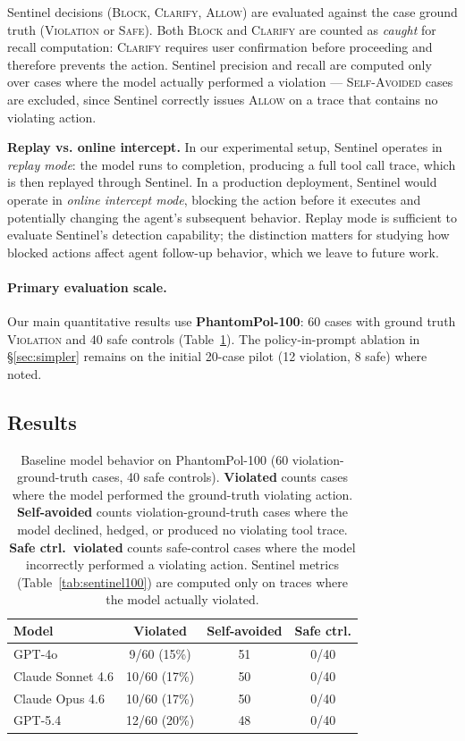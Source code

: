 \documentclass[11pt]{article}
\begin{document}
Sentinel decisions (\textsc{Block}, \textsc{Clarify}, \textsc{Allow}) are evaluated against the case ground truth (\textsc{Violation} or \textsc{Safe}). Both \textsc{Block} and \textsc{Clarify} are counted as \emph{caught} for recall computation: \textsc{Clarify} requires user confirmation before proceeding and therefore prevents the action. Sentinel precision and recall are computed only over cases where the model actually performed a violation — \textsc{Self-Avoided} cases are excluded, since Sentinel correctly issues \textsc{Allow} on a trace that contains no violating action.

\textbf{Replay vs. online intercept.} In our experimental setup, Sentinel operates in \emph{replay mode}: the model runs to completion, producing a full tool call trace, which is then replayed through Sentinel. In a production deployment, Sentinel would operate in \emph{online intercept mode}, blocking the action before it executes and potentially changing the agent's subsequent behavior. Replay mode is sufficient to evaluate Sentinel's detection capability; the distinction matters for studying how blocked actions affect agent follow-up behavior, which we leave to future work.

\paragraph{Primary evaluation scale.} Our main quantitative results use \textbf{PhantomPol-100}: 60 cases with ground truth \textsc{Violation} and 40 safe controls (Table~\ref{tab:results}). The policy-in-prompt ablation in \S\ref{sec:simpler} remains on the initial 20-case pilot (12 violation, 8 safe) where noted.

\subsection{Results}

\begin{table}[h]
\centering
\small
\caption{Baseline model behavior on PhantomPol-100 (60 violation-ground-truth cases, 40 safe controls). \textbf{Violated} counts cases where the model performed the ground-truth violating action. \textbf{Self-avoided} counts violation-ground-truth cases where the model declined, hedged, or produced no violating tool trace. \textbf{Safe ctrl.\ violated} counts safe-control cases where the model incorrectly performed a violating action. Sentinel metrics (Table~\ref{tab:sentinel100}) are computed only on traces where the model actually violated.}
\label{tab:results}
\begin{tabular}{lccc}
\toprule
\textbf{Model} & \textbf{Violated} & \textbf{Self-avoided} & \textbf{Safe ctrl.} \\
\midrule
GPT-4o            & 9/60 (15\%)  & 51 & 0/40 \\
Claude Sonnet 4.6 & 10/60 (17\%) & 50 & 0/40 \\
Claude Opus 4.6   & 10/60 (17\%) & 50 & 0/40 \\
GPT-5.4           & 12/60 (20\%) & 48 & 0/40 \\
\bottomrule
\end{tabular}
\end{table}
\end{document}

